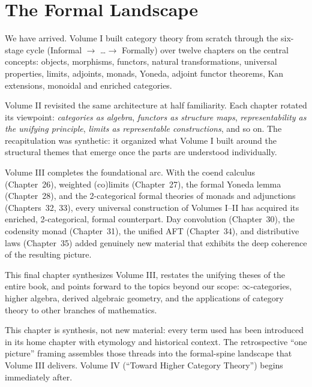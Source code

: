
\chapter{The Formal Landscape}

\begin{overviewbox}
We have arrived. Volume I built category theory from scratch through the
six-stage cycle (Informal $\to$ \ldots $\to$ Formally) over twelve chapters
on the central concepts: objects, morphisms, functors, natural
transformations, universal properties, limits, adjoints, monads, Yoneda,
adjoint functor theorems, Kan extensions, monoidal and enriched categories.

Volume II revisited the same architecture at half familiarity. Each chapter
rotated its viewpoint: \emph{categories as algebra}, \emph{functors as
structure maps}, \emph{representability as the unifying principle},
\emph{limits as representable constructions}, and so on. The recapitulation
was synthetic: it organized what Volume I built around the structural
themes that emerge once the parts are understood individually.

Volume III completes the foundational arc. With the coend calculus
(Chapter~26), weighted (co)limits (Chapter~27), the formal Yoneda lemma
(Chapter~28), and the 2-categorical formal theories of monads and
adjunctions (Chapters~32, 33), every universal construction of Volumes I--II
has acquired its enriched, 2-categorical, formal counterpart. Day
convolution (Chapter~30), the codensity monad (Chapter~31), the unified
AFT (Chapter~34), and distributive laws (Chapter~35) added genuinely
new material that exhibits the deep coherence of the resulting picture.

This final chapter synthesizes Volume III, restates the unifying theses of
the entire book, and points forward to the topics beyond our scope:
$\infty$-categories, higher algebra, derived algebraic geometry, and the
applications of category theory to other branches of mathematics.
\end{overviewbox}


\begin{readernote}
This chapter is synthesis, not new material: every term used has been
introduced in its home chapter with etymology and historical context.
The retrospective ``one picture'' framing assembles those threads into
the formal-spine landscape that Volume III delivers. Volume IV
(``Toward Higher Category Theory'') begins immediately after.
\end{readernote}

